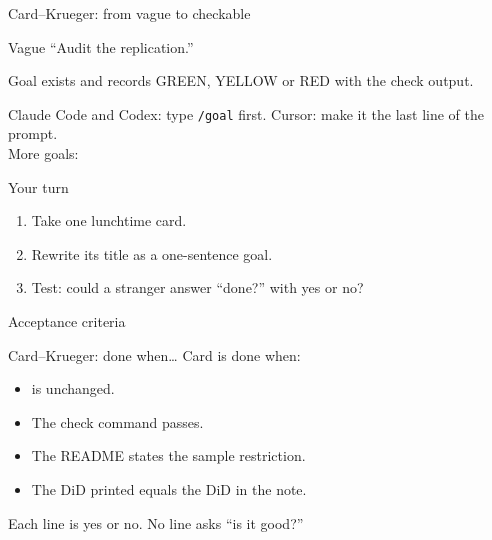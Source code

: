 \begin{frame}{Card--Krueger: from vague to checkable}
  \begin{block}{Vague}
    ``Audit the replication.''
  \end{block}
  \vspace{0.3em}
  \begin{block}{Goal}
     exists and records GREEN, YELLOW or RED
    with the check output.
  \end{block}
  \vspace{0.4em}
  {\small Claude Code and Codex: type \texttt{/goal} first. Cursor: make it the last line of the prompt.}\\
  {\small More goals: }
\end{frame}

\begin{frame}{Your turn}
  \vspace{0.3em}
  \begin{enumerate}
    \item Take one lunchtime card.
    \item Rewrite its title as a one-sentence goal.
    \item Test: could a stranger answer ``done?'' with yes or no?
  \end{enumerate}
\end{frame}

\begin{frame}{Acceptance criteria}
\end{frame}

\begin{frame}{Card--Krueger: done when\ldots}
  Card  is done when:
  \vspace{0.3em}
  \begin{itemize}
    \item[$\square$]  is unchanged.
    \item[$\square$] The check command passes.
    \item[$\square$] The README states the sample restriction.
    \item[$\square$] The DiD printed equals the DiD in the note.
  \end{itemize}
  \vspace{0.4em}
  Each line is yes or no. No line asks ``is it good?''
\end{frame}

